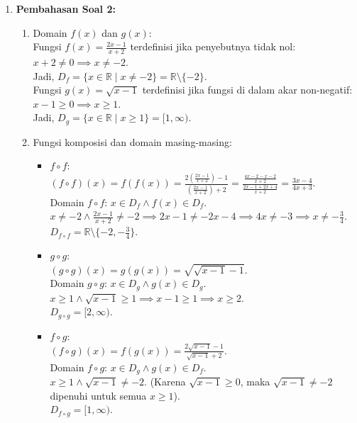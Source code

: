 \documentclass[11pt,openany,a4paper]{article}
\begin{document}
\begin{enumerate}
  \item \textbf{Pembahasan Soal 2:}
        \begin{enumerate}
          \item Domain $f(x)$ dan $g(x)$: \\
                Fungsi $f(x) = \frac{2x-1}{x+2}$ terdefinisi jika penyebutnya tidak nol: $x + 2 \ne 0 \implies x \ne -2$. \\
                Jadi, $D_f = \{x \in \mathbb{R} \mid x \ne -2\} = \mathbb{R} \setminus \{-2\}$. \\
                Fungsi $g(x) = \sqrt{x-1}$ terdefinisi jika fungsi di dalam akar non-negatif: $x - 1 \ge 0 \implies x \ge 1$. \\
                Jadi, $D_g = \{x \in \mathbb{R} \mid x \ge 1\} = [1, \infty)$.
          \item Fungsi komposisi dan domain masing-masing:
                \begin{itemize}
                  \item $f \circ f$: \\
                        $(f \circ f)(x) = f(f(x)) = \frac{2\left(\frac{2x-1}{x+2}\right)-1}{\left(\frac{2x-1}{x+2}\right)+2} = \frac{\frac{4x-2-x-2}{x+2}}{\frac{2x-1+2x+4}{x+2}} = \frac{3x-4}{4x+3}$. \\
                        Domain $f \circ f$: $x \in D_f \land f(x) \in D_f$. \\
                        $x \ne -2 \land \frac{2x-1}{x+2} \ne -2 \implies 2x - 1 \ne -2x - 4 \implies 4x \ne -3 \implies x \ne -\frac{3}{4}$. \\
                        $D_{f \circ f} = \mathbb{R} \setminus \{-2, -\frac{3}{4}\}$.
                  
                  \item $g \circ g$: \\
                        $(g \circ g)(x) = g(g(x)) = \sqrt{\sqrt{x-1} - 1}$. \\
                        Domain $g \circ g$: $x \in D_g \land g(x) \in D_g$. \\
                        $x \ge 1 \land \sqrt{x-1} \ge 1 \implies x - 1 \ge 1 \implies x \ge 2$. \\
                        $D_{g \circ g} = [2, \infty)$.

                  \item $f \circ g$: \\
                        $(f \circ g)(x) = f(g(x)) = \frac{2\sqrt{x-1}-1}{\sqrt{x-1}+2}$. \\
                        Domain $f \circ g$: $x \in D_g \land g(x) \in D_f$. \\
                        $x \ge 1 \land \sqrt{x-1} \ne -2$. (Karena $\sqrt{x-1} \ge 0$, maka $\sqrt{x-1} \ne -2$ dipenuhi untuk semua $x \ge 1$). \\
                        $D_{f \circ g} = [1, \infty)$.


\end{itemize}
\end{enumerate}
\end{enumerate}
\end{document}
